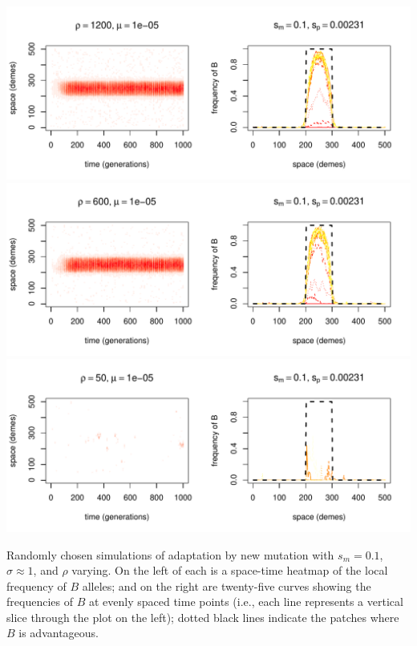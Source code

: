 \documentclass{article}
\begin{document}
\begin{sfigure}
  \begin{center}
    \includegraphics{example-mutation-sims/18885-r1-501-sb0_01-sm-0_1-N1200-pophistory-run}
    \includegraphics{example-mutation-sims/56325-r1-501-sb0_01-sm-0_1-N600-pophistory-run}
    \includegraphics{example-mutation-sims/28432-r1-501-sb0_01-sm-0_1-N50-pophistory-run}
  \end{center}
  \caption{
    Randomly chosen simulations of adaptation by new mutation
    with $s_m=0.1$, $\sigma\approx 1$, and $\rho$ varying.
    On the left of each is a space-time heatmap of the local frequency of $B$ alleles;
    and on the right are twenty-five curves showing the frequencies of $B$ at evenly spaced time points
    (i.e., each line represents a vertical slice through the plot on the left);
    dotted black lines indicate the patches where $B$ is advantageous.
  } \label{sfig:sims_1}
\end{sfigure}
\end{document}
